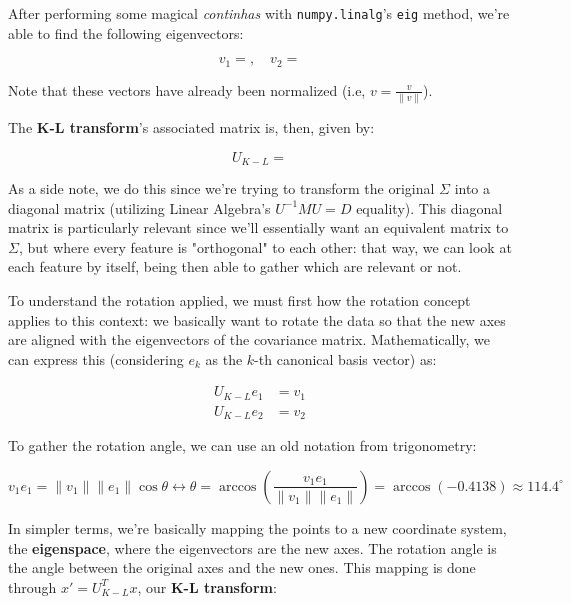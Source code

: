 \documentclass[12pt]{article}
\begin{document}
\begin{enumerate}[leftmargin=\labelsep]
  After performing some magical \textit{continhas} with \texttt{numpy.linalg}'s \texttt{eig}
  method, we're able to find the following eigenvectors:

  \begin{equation*}
    v_1 = , \quad v_2 = 
  \end{equation*}

  Note that these vectors have already been normalized (i.e, $v = \frac{v}{\|v\|}$).

  The \textbf{K-L transform}'s associated matrix is, then, given by:

  \begin{equation*}
    U_{K-L} = 
  \end{equation*}

  As a side note, we do this since we're trying to transform the original
  $\Sigma$ into a diagonal matrix (utilizing Linear Algebra's $U^{-1} M U = D$ equality).
  This diagonal matrix is particularly relevant since we'll essentially
  want an equivalent matrix to $\Sigma$, but where every feature is "orthogonal"
  to each other: that way, we can look at each feature by itself,
  being then able to gather which are relevant or not.

  To understand the rotation applied, we must first how the rotation concept applies
  to this context: we basically want to rotate the data so that the new axes are
  aligned with the eigenvectors of the covariance matrix. Mathematically, we can
  express this (considering $e_k$ as the $k$-th canonical basis vector) as:

  \begin{equation*}
    \begin{aligned}
      U_{K-L} e_1 & = v_1 \\
      U_{K-L} e_2 & = v_2
    \end{aligned}
  \end{equation*}

  To gather the rotation angle, we can use an old notation from trigonometry:

  \begin{equation*}
    v_1 e_1 = \| v_1 \| \| e_1 \| \cos\theta \leftrightarrow
    \theta = \arccos\left(\frac{v_1 e_1}{\| v_1 \| \| e_1 \|}\right)
    = \arccos (-0.4138) \approx 114.4^\circ
  \end{equation*}

  In simpler terms, we're basically mapping the points to a new coordinate system,
  the \textbf{eigenspace}, where the eigenvectors are the new axes. The rotation
  angle is the angle between the original axes and the new ones. This mapping is done
  through $x' = U_{K-L}^T x$, our \textbf{K-L transform}:


\end{enumerate}
\end{document}
